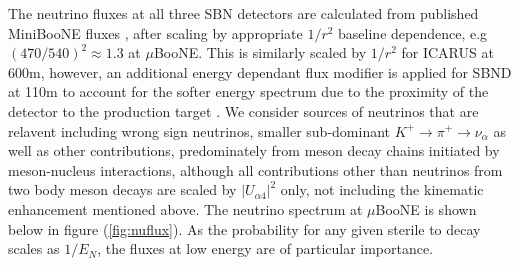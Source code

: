 \documentclass[11pt, a4paper]{article}
\begin{document}
The neutrino fluxes at all three SBN detectors are calculated from published MiniBooNE fluxes \cite{AguilarArevalo:2008yp}, after scaling by appropriate $1/r^2$ baseline dependence, e.g $(470/540)^2 \approx 1.3$ at $\mu$BooNE. This is similarly scaled by $1/r^2$ for ICARUS at 600m, however, an additional energy dependant flux modifier is applied for SBND at 110m to account for the softer energy spectrum due to the proximity of the detector to the production target \cite{Antonello:2015lea}. We consider sources of neutrinos that are relavent including wrong sign neutrinos, smaller sub-dominant $K^+\rightarrow \pi^+\rightarrow \nu_\alpha$ as well as other contributions, predominately from meson decay chains initiated by meson-nucleus interactions, although all contributions other than neutrinos from two body meson decays are scaled by $|U_{\alpha 4}|^2$ only, not including the kinematic enhancement mentioned above. The neutrino spectrum at $\mu$BooNE is shown below in figure (\ref{fig:nuflux}). As the probability for any given sterile to decay scales as $1/E_N$, the fluxes at low energy are of particular importance. 
\end{document}
